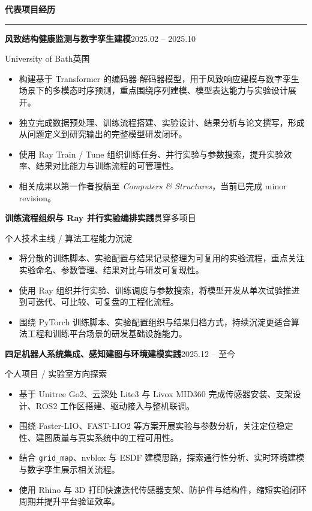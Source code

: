 \documentclass[UTF8,11pt,a4paper,fontset=fandol]{ctexart}
\newcommand{\CVSection}[1]{%
  \vspace{7pt}%
  {\large\bfseries #1}\par
  \vspace{4pt}\hrule\vspace{5pt}%
}
\newcommand{\EntryHeader}[4]{%
  {\bfseries #1}\hfill {#2}\par
  {\color{black!75}#3}\hfill {\color{black!75}#4}\par
}
\newcommand{\EntryHeaderSingle}[2]{%
  {\bfseries #1}\hfill {#2}\par
}
\newcommand{\Muted}[1]{{\color{black!70}#1}}
\begin{document}
\CVSection{代表项目经历}

\EntryHeader{风致结构健康监测与数字孪生建模}{2025.02 -- 2025.10}{University of Bath}{英国}
\begin{itemize}
  \item 构建基于 Transformer 的编码器-解码器模型，用于风致响应建模与数字孪生场景下的多模态时序预测，重点围绕序列建模、模型表达能力与实验设计展开。
  \item 独立完成数据预处理、训练流程搭建、实验设计、结果分析与论文撰写，形成从问题定义到研究输出的完整模型研发闭环。
  \item 使用 Ray Train / Tune 组织训练任务、并行实验与参数搜索，提升实验效率、结果对比能力与训练流程的可管理性。
  \item 相关成果以第一作者投稿至 \emph{Computers \& Structures}，当前已完成 minor revision。
\end{itemize}

\vspace{3pt}
\EntryHeaderSingle{训练流程组织与 Ray 并行实验编排实践}{贯穿多项目}
\Muted{个人技术主线 / 算法工程能力沉淀}\par
\begin{itemize}
  \item 将分散的训练脚本、实验配置与结果记录整理为可复用的实验流程，重点关注实验命名、参数管理、结果对比与研发可复现性。
  \item 使用 Ray 组织并行实验、训练调度与参数搜索，将模型开发从单次试验推进到可迭代、可比较、可复盘的工程化流程。
  \item 围绕 PyTorch 训练脚本、实验配置组织与结果归档方式，持续沉淀更适合算法工程和训练平台场景的研发基础设施能力。
\end{itemize}

\vspace{3pt}
\EntryHeaderSingle{四足机器人系统集成、感知建图与环境建模实践}{2025.12 -- 至今}
\Muted{个人项目 / 实验室方向探索}\par
\begin{itemize}
  \item 基于 Unitree Go2、云深处 Lite3 与 Livox MID360 完成传感器安装、支架设计、ROS2 工作区搭建、驱动接入与整机联调。
  \item 围绕 Faster-LIO、FAST-LIO2 等方案开展实验与参数分析，关注定位稳定性、建图质量与真实系统中的工程可用性。
  \item 结合 \texttt{grid\_map}、nvblox 与 ESDF 建模思路，探索通行性分析、实时环境建模与数字孪生展示相关流程。
  \item 使用 Rhino 与 3D 打印快速迭代传感器支架、防护件与结构件，缩短实验闭环周期并提升平台验证效率。
\end{itemize}
\end{document}

